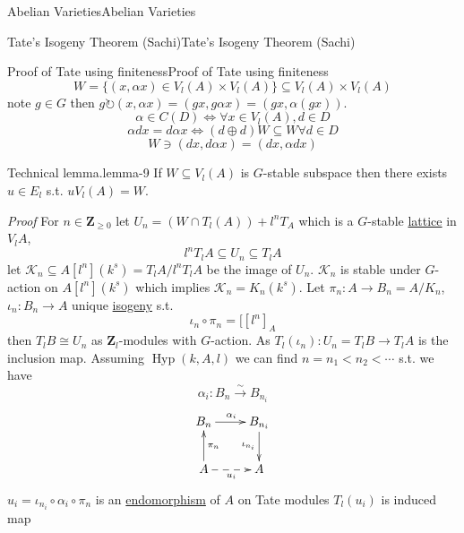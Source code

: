 \documentclass[10pt,]{book}
\makeatletter
\renewcommand*{\proofname}{Proof}
\renewenvironment{proof}[1][\proofname]{\par
  \pushQED{\qed}%
  \normalfont \topsep6\p@\@plus6\p@\relax
  \trivlist
  \item\relax
    {\itshape
    #1\@addpunct{.}}\hspace\labelsep\ignorespaces
}{%
  \popQED\endtrivlist\@endpefalse
}
\numberwithin{equation}{section}
\newcommand{\lb}{[}
\newcommand{\rb}{]}
\newcommand{\ZZ}{\mathbf{Z}}
\newcommand{\acts}{\circlearrowright}
\newcommand{\lt}{<}
\makeatother
\begin{document}
\begin{chapterptx}{Abelian Varieties}{}{Abelian Varieties}{}{}
\begin{sectionptx}{Tate's Isogeny Theorem (Sachi)}{}{Tate's Isogeny Theorem (Sachi)}{}{}
\begin{subsectionptx}{Proof of Tate using finiteness}{}{Proof of Tate using finiteness}{}{}
\begin{equation*}
W = \{(x,\alpha x) \in V_l(A)\times V_l(A)\} \subseteq V_l(A)\times V_l(A)
\end{equation*}
note \(g\in G\) then \(g\acts (x,\alpha x) = (gx,g\alpha x ) = (gx, \alpha(gx))\).%
\begin{equation*}
\alpha\in C(D) \iff \forall x\in V_l(A), d\in D
\end{equation*}
%
\begin{equation*}
\alpha d x = d\alpha x \iff (d\oplus d)W \subseteq W \forall d\in D
\end{equation*}
%
\begin{equation*}
W\ni (dx, d\alpha x) = (dx, \alpha d x)
\end{equation*}
%
\begin{lemma}{Technical lemma.}{}{lemma-9}%
\hypertarget{p-393}{}%
If \(W\subseteq V_l(A)\) is \(G\)-stable subspace then there exists \(u\in E_l\) s.t. \(u V_l(A) = W\).%
\end{lemma}
\begin{proof}\hypertarget{proof-67}{}
\hypertarget{p-394}{}%
For \(n \in \ZZ_{\ge 0}\) let \(U_n = (W\cap T_l(A)) + l^n T_A\) which is a \(G\)-stable \hyperref[def-buntes-lattice]{lattice} in \(V_l A\),%
\begin{equation*}
l^nT_lA \subseteq U_n \subseteq T_l A
\end{equation*}
let \(\mathcal K_n \subseteq A\lb l^n \rb (k^s) = T_l A/ l^n T_l A\) be the image of \(U_n\). \(\mathcal K_n\) is stable under \(G\)-action on \(A\lb l^n \rb (k^s)\) which implies \(\mathcal K_n = K_n (k^s)\). Let \(\pi_n \colon A \to B_n = A/ K_n\), \(\iota_n \colon B_n \to A\) unique \hyperref[def-supersing-isog-isog]{isogeny} s.t.%
\begin{equation*}
\iota_n \circ \pi_n  =  \lb [l^n]_A
\end{equation*}
then \(T_lB \cong U_n\) as \(\ZZ_l\)-modules with \(G\)-action. As \(T_l(\iota_n) \colon U_n =T_l B  \to T_l A\) is the inclusion map. Assuming \(\operatorname{Hyp}(k,A,l)\) we can find \(n = n_1 \lt n_2 \lt \cdots\) s.t. we have%
\begin{equation*}
\alpha_i \colon B_n \xrightarrow{\sim} B_{n_i}
\end{equation*}
%
\begin{equation*}
\xymatrix{
B_n \ar[r]^{\alpha_i} & B_{n_i} \ar[d]_{\iota_{n_i}}\\
A\ar[u]_{\pi_n} \ar@{-->}_{u_i}[r] & A
}
\end{equation*}
\(u_i = \iota_{n_i} \circ \alpha_i \circ \pi_n\) is an \hyperref[def-supersing-isog-endo]{endomorphism} of \(A\) on Tate modules \(T_l(u_i)\) is induced map%

\end{proof}
\end{subsectionptx}
\end{sectionptx}
\end{chapterptx}
\end{document}
